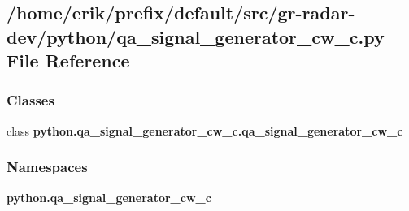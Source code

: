 \subsection{/home/erik/prefix/default/src/gr-\/radar-\/dev/python/qa\+\_\+signal\+\_\+generator\+\_\+cw\+\_\+c.py File Reference}
\label{qa__signal__generator__cw__c_8py}
\subsubsection*{Classes}
\begin{DoxyCompactItemize}
\item 
class {\bf python.\+qa\+\_\+signal\+\_\+generator\+\_\+cw\+\_\+c.\+qa\+\_\+signal\+\_\+generator\+\_\+cw\+\_\+c}
\end{DoxyCompactItemize}
\subsubsection*{Namespaces}
\begin{DoxyCompactItemize}
\item 
 {\bf python.\+qa\+\_\+signal\+\_\+generator\+\_\+cw\+\_\+c}
\end{DoxyCompactItemize}
